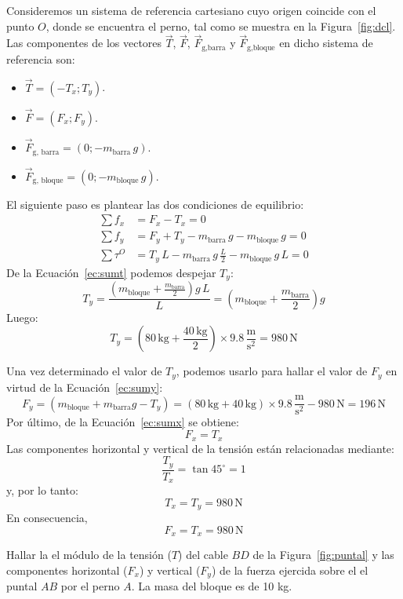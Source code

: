 \documentclass[addpoints]{exam}
\newcommand{\grado}[0]{^{\circ}}
\begin{document}
\begin{questions}
    \begin{solution}
    Consideremos un sistema de referencia cartesiano cuyo origen coincide con el punto $O$, donde se encuentra el perno, tal como se muestra en la Figura~\ref{fig:dcl}. Las componentes de los vectores $\vec{T}$, $\vec{F}$, $\vec{F}_\text{g,barra}$ y $\vec{F}_\text{g,bloque}$ en dicho sistema de referencia son:
    \begin{itemize}
        \item $\vec{T} = \left(-T_x;T_y\right)$.
        \item $\vec{F} = \left(F_x;F_y\right)$.
        \item $\vec{F}_\text{g, barra} = \left(0;-m_\text{barra} \, g\right)$.
        \item $\vec{F}_\text{g, bloque} = \left(0;-m_\text{bloque} \, g\right)$.
    \end{itemize} El siguiente paso es plantear las dos condiciones de equilibrio:
    \begin{align}
        \sum f_x &= F_x - T_x = 0 \label{ec:sumx} \\
        \sum f_y &= F_y + T_y - m_\text{barra} \, g -m_\text{bloque} \, g = 0 \label{ec:sumy} \\
        \sum \tau^{O} &= T_y \, L - m_\text{barra} \, g \, \frac{L}{2} -m_\text{bloque} \, g \, L = 0 \label{ec:sumt} 
    \end{align} De la Ecuación~\eqref{ec:sumt} podemos despejar $T_y$: $$T_y = \frac{\left(m_\text{bloque} + \frac{m_\text{barra}}{2}\right) g\, L}{L} = \left(m_\text{bloque} + \frac{m_\text{barra}}{2}\right) g$$ Luego: $$T_y = \left(80 \, \text{kg} + \frac{40 \, \text{kg}}{2}\right) \times 9.8 \, \frac{\text{m}}{\text{s}^2} = 980 \, \text{N}$$

    Una vez determinado el valor de $T_y$, podemos usarlo para hallar el valor de $F_y$ en virtud de la Ecuación~\eqref{ec:sumy}: $$F_y = \left(m_\text{bloque} + m_\text{barra} g - T_y\right) = \left(80 \, \text{kg} + 40 \, \text{kg}\right) \times 9.8 \, \frac{\text{m}}{\text{s}^2} - 980 \, \text{N} = 196 \, \text{N}$$ Por último, de la Ecuación~\eqref{ec:sumx} se obtiene: $$F_x = T_x$$ Las componentes horizontal y vertical de la tensión están relacionadas mediante: $$\frac{T_y}{T_x} = \tan 45\grado = 1$$ y, por lo tanto: $$T_x = T_y = 980 \, \text{N}$$ En consecuencia, $$F_x = T_x = 980 \, \text{N}$$
    \end{solution}

    \question Hallar la el módulo de la tensión ($T$) del cable $BD$ de la Figura~\ref{fig:puntal} y las componentes horizontal ($F_x$) y vertical ($F_y$) de la fuerza ejercida sobre el el puntal $AB$ por el perno $A$. La masa del bloque es de 10 kg.


\end{questions}
\end{document}
